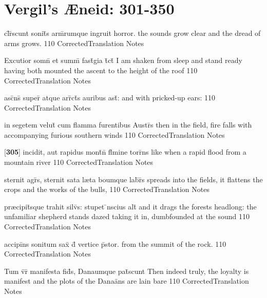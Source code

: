 \section{Vergil's {\AE}neid: 301-350} %

\latline
  {cl\={}r\={}scunt sonit\={}s arm\={}rumque ingruit horror.}
  { the sounds grow clear and the dread of arms grows. }
  {110}
  { CorrectedTranslation }
  { Notes }


\latline
  {Excutior somn\={} et summ\={\macron {\i}} fast\={\macron {\i}}gia t\={}ct\={\macron {\i}}}
  { I am shaken from sleep and stand ready having both mounted the ascent to the height of the roof  }
  {110}
  { CorrectedTranslation }
  { Notes }


\latline
  {asc\={}ns\={} super\={} atque arr\={}ct\={\macron {\i}}s auribus ast\={}:}
  { and with pricked-up ears: }
  {110}
  { CorrectedTranslation }
  { Notes }


\latline
  {in segetem velut\={\macron {\i}} cum flamma furentibus Austr\={\macron {\i}}s}
  { then in the field, fire falls with accompanying furious southern winds }
  {110}
  { CorrectedTranslation }
  { Notes }


\latline
  {[\textbf{305}] incidit, aut rapidus mont\={}n\={} fl\={}mine torr\={}ns}
  { like when a rapid flood from a mountain river }
  {110}
  { CorrectedTranslation }
  { Notes }


\latline
  {sternit agr\={}s, sternit sata l{\ae}ta boumque lab\={}r\={}s}
  { spreads into the fields, it flattens the crops and the works of the bulls,  }
  {110}
  { CorrectedTranslation }
  { Notes }


\latline
  {pr{\ae}cipit\={\macron {\i}}sque trahit silv\={}s: stupet \={\macron {\i}}nscius alt\={}}
  { and it drags the forests headlong: the unfamiliar shepherd stands dazed taking it in, dumbfounded at the sound   }
  {110}
  { CorrectedTranslation }
  { Notes }


\latline
  {accipi\={}ns sonitum sax\={\macron {\i}} d\={} vertice p\={}stor.}
  { from the summit of the rock. }
  {110}
  { CorrectedTranslation }
  { Notes }


\latline
  {Tum v\={}r\={} manifesta fid\={}s, Danaumque pat\={}scunt}
  { Then indeed truly, the loyalty is manifest and the plots of the Dana\"ans are lain bare }
  {110}
  { CorrectedTranslation }
  { Notes }


